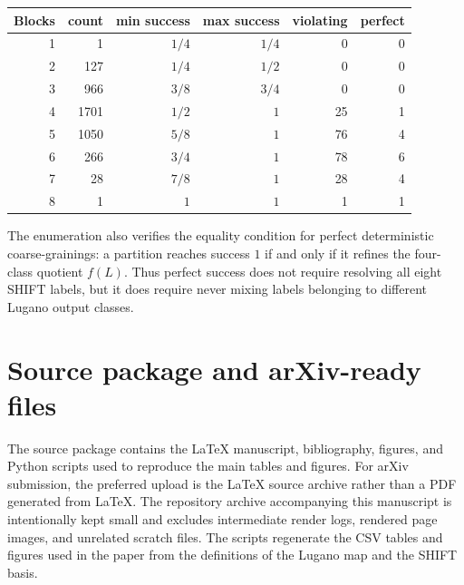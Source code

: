 \documentclass[11pt,a4paper]{article}
\begin{document}
\begin{center}
\begin{tabular}{rrrrrr}
\toprule
Blocks & count & min success & max success & violating & perfect\\
\midrule
1 & 1 & $1/4$ & $1/4$ & 0 & 0\\
2 & 127 & $1/4$ & $1/2$ & 0 & 0\\
3 & 966 & $3/8$ & $3/4$ & 0 & 0\\
4 & 1701 & $1/2$ & $1$ & 25 & 1\\
5 & 1050 & $5/8$ & $1$ & 76 & 4\\
6 & 266 & $3/4$ & $1$ & 78 & 6\\
7 & 28 & $7/8$ & $1$ & 28 & 4\\
8 & 1 & $1$ & $1$ & 1 & 1\\
\bottomrule
\end{tabular}
\end{center}

The enumeration also verifies the equality condition for perfect deterministic coarse-grainings: a partition reaches success $1$ if and only if it refines the four-class quotient $f(L)$.  Thus perfect success does not require resolving all eight SHIFT labels, but it does require never mixing labels belonging to different Lugano output classes.

\section{Source package and arXiv-ready files}
\label{app:source-package}

The source package contains the \LaTeX{} manuscript, bibliography, figures, and Python scripts used to reproduce the main tables and figures.  For arXiv submission, the preferred upload is the \LaTeX{} source archive rather than a PDF generated from \LaTeX{}.  The repository archive accompanying this manuscript is intentionally kept small and excludes intermediate render logs, rendered page images, and unrelated scratch files.  The scripts regenerate the CSV tables and figures used in the paper from the definitions of the Lugano map and the SHIFT basis.


\printbibliography
\end{document}
